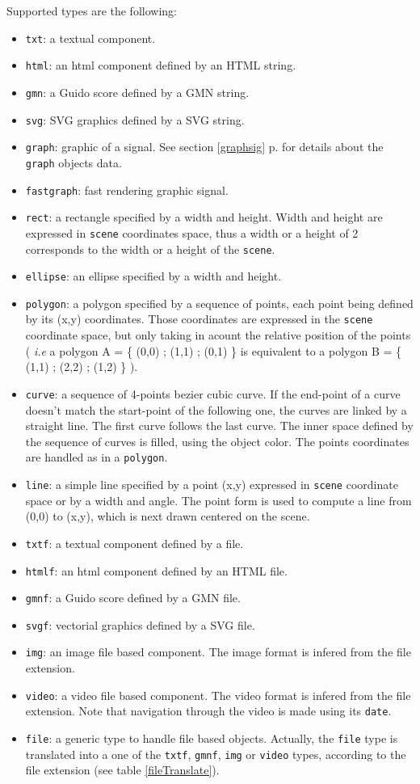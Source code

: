 \documentclass[a4paper,twoside]{report}
\newcommand{\fullref}[1]	{\ref{#1} p.\pageref{#1}}
\newcommand{\OSC}[1]		{\texttt{#1}}
\begin{document}
Supported types are the following:
\begin{itemize}
\item \OSC{txt}: a textual component.
\item \OSC{html}: an html component defined by an HTML string.
\item \OSC{gmn}: a Guido score defined by a GMN string.
\item \OSC{svg}: SVG graphics defined by a SVG string.
\item \OSC{graph}: graphic of a signal. See section \fullref{graphsig} for details about the \OSC{graph} objects data.
\item \OSC{fastgraph}: fast rendering graphic signal.
\item \OSC{rect}: a rectangle specified by a width and height. Width and height are expressed in \OSC{scene} coordinates space, thus a width or a height of 2 corresponds to the width or a height of the \OSC{scene}.
\item \OSC{ellipse}: an ellipse specified by a width and height.
\item \OSC{polygon}: a polygon specified by a sequence of points, each point being defined by its (x,y) coordinates. Those coordinates are expressed in the \OSC{scene} coordinate space, but only taking in acount the relative position of the points ( \emph{i.e} a polygon A = \{ (0,0) ; (1,1) ; (0,1) \} is equivalent to a polygon B = \{ (1,1) ; (2,2) ; (1,2) \} ).
\item \OSC{curve}: a sequence of 4-points bezier cubic curve. If the end-point of a curve doesn't match the start-point of the following one, the curves are linked by a straight line. The first curve follows the last curve. The inner space defined by the sequence of curves is filled, using the object color. The points coordinates are handled as in a \OSC{polygon}.
\item \OSC{line}: a simple line specified by a point (x,y) expressed in \OSC{scene} coordinate space or by a width and angle. The point form is used to compute a line from (0,0) to (x,y), which is next drawn centered on the scene.
\item \OSC{txtf}: a textual component defined by a file.
\item \OSC{htmlf}: an html component defined by an HTML file.
\item \OSC{gmnf}: a Guido score defined by a GMN file.
\item \OSC{svgf}: vectorial graphics defined by a SVG file.
\item \OSC{img}: an image file based component. The image format is infered from the file extension.
\item \OSC{video}: a video file based component. The video format is infered from the file extension. Note that navigation through the video is made using its \OSC{date}.
\item \OSC{file}: a generic type to handle file based objects. Actually, the \OSC{file} type is translated into a one of the \OSC{txtf}, \OSC{gmnf}, \OSC{img} or \OSC{video} types, according to the file extension (see table \ref{fileTranslate}).
\end{itemize}
\end{document}
